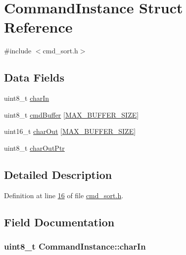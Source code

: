 \hypertarget{struct_command_instance}{\section{Command\-Instance Struct Reference}
\label{struct_command_instance}
}


{\ttfamily \#include $<$cmd\-\_\-sort.\-h$>$}

\subsection*{Data Fields}
\begin{DoxyCompactItemize}
\item 
uint8\-\_\-t \hyperlink{struct_command_instance_a34f2e2824ae663982ef5d8a9ae4dbd76}{char\-In}
\item 
uint8\-\_\-t \hyperlink{struct_command_instance_a8b8b51e6eacf265b2fb0c83dc8fc8823}{cmd\-Buffer} \mbox{[}\hyperlink{cmd__sort_8h_ad4d796b98c583d49e83adabd74a63bf6}{M\-A\-X\-\_\-\-B\-U\-F\-F\-E\-R\-\_\-\-S\-I\-Z\-E}\mbox{]}
\item 
uint16\-\_\-t \hyperlink{struct_command_instance_af1524bd8db77ca27b543a3c2a1a5638f}{char\-Out} \mbox{[}\hyperlink{cmd__sort_8h_ad4d796b98c583d49e83adabd74a63bf6}{M\-A\-X\-\_\-\-B\-U\-F\-F\-E\-R\-\_\-\-S\-I\-Z\-E}\mbox{]}
\item 
uint8\-\_\-t \hyperlink{struct_command_instance_a4817d15d26b34d5b4ae000d12e4d73ac}{char\-Out\-Ptr}
\end{DoxyCompactItemize}


\subsection{Detailed Description}


Definition at line \hyperlink{cmd__sort_8h_source_l00016}{16} of file \hyperlink{cmd__sort_8h_source}{cmd\-\_\-sort.\-h}.



\subsection{Field Documentation}
\hypertarget{struct_command_instance_a34f2e2824ae663982ef5d8a9ae4dbd76}{
\subsubsection[{char\-In}]{\setlength{\rightskip}{0pt plus 5cm}uint8\-\_\-t Command\-Instance\-::char\-In}}\label{struct_command_instance_a34f2e2824ae663982ef5d8a9ae4dbd76}


